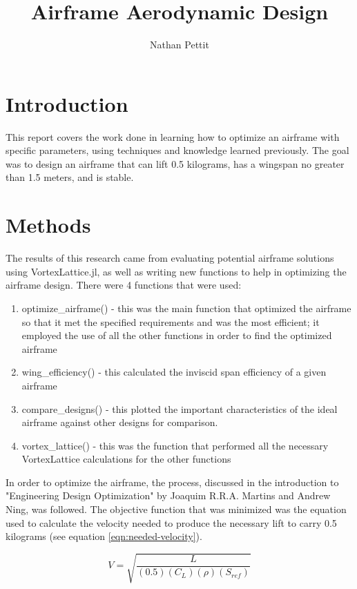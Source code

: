 \documentclass{journal}
\title{Airframe Aerodynamic Design}
\author{Nathan Pettit}
\begin{document}
	
	\maketitle	
	
	\section{Introduction}
	
	This report covers the work done in learning how to optimize an airframe with specific parameters, using techniques and knowledge learned previously. The goal was to design an airframe that can lift 0.5 kilograms, has a wingspan no greater than 1.5 meters, and is stable.
	
	\section{Methods}
	The results of this research came from evaluating potential airframe solutions using VortexLattice.jl, as well as writing new functions to help in optimizing the airframe design. There were 4 functions that were  used:
	
	\begin{enumerate}
		\item optimize\_airframe() - this was the main function that optimized the airframe so that it met the specified requirements and was the most efficient; it employed the use of all the other functions in order to find the optimized airframe
		\item wing\_efficiency() - this calculated the inviscid span efficiency of a given airframe
		\item compare\_designs() - this plotted the important characteristics of the ideal airframe against other designs for comparison.
		\item vortex\_lattice() - this was the function that performed all the necessary VortexLattice calculations for the other functions 
	\end{enumerate}

	In order to optimize the airframe, the process, discussed in the introduction to "Engineering Design Optimization" by Joaquim R.R.A. Martins and Andrew Ning, was followed. The objective function  that was minimized was the equation used to calculate the velocity needed to produce the necessary lift to carry 0.5 kilograms (see equation \ref{eqn:needed-velocity}).
	
	\begin{equation}
		V = \sqrt{\frac{L}{(0.5)(C_L)(\rho)(S_{ref})}}
		\label{eqn:needed-velocity}
	\end{equation}
\end{document}
